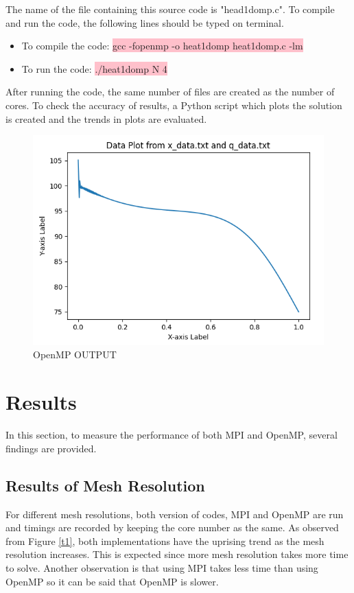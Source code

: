 \documentclass{article}
\begin{document}
The name of the file containing this source code is "head1d\textunderscore omp.c". To compile and run the code, the following lines should be typed on terminal. 
\begin{itemize}
\color{black}
\item To compile the code: \colorbox{pink}{gcc -fopenmp -o heat1d\textunderscore omp heat1d\textunderscore omp.c -lm}
\item To run the code: \colorbox{pink}{./heat1d\textunderscore omp N 4}
\end{itemize}

After running the code, the same number of files are created as the number of cores. To check the accuracy of results, a Python script which plots the solution is created and the trends in plots are evaluated. 

\begin{figure}[hbt!]
    \centering
    \includegraphics[width=1\textwidth]{Figures/Openmpi.png}
    \caption{OpenMP OUTPUT}
    \label{figure_1}
\end{figure}


\clearpage
\section{Results}
In this section, to measure the performance of both MPI and OpenMP, several findings are provided. 

\subsection{Results of Mesh Resolution}
For different mesh resolutions, both version of codes, MPI and OpenMP are run and timings are recorded by keeping the core number as the same. As observed from Figure \ref{t1}, both implementations have the uprising trend as the mesh resolution increases. This is expected since more mesh resolution takes more time to solve. Another observation is that using MPI takes less time than using OpenMP so it can be said that OpenMP is slower. 
\end{document}
